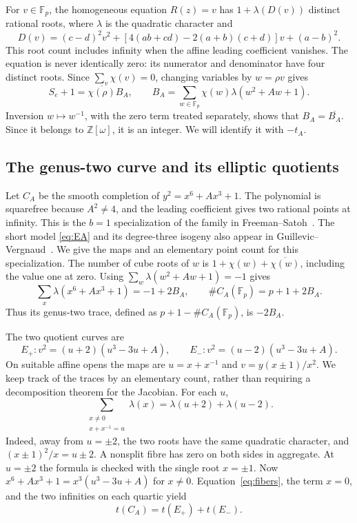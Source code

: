 \documentclass[11pt]{article}
\theoremstyle{definition}\newtheorem{definition}[theorem]{Definition}
\newcommand{\Fp}{\mathbb F_p}
\newcommand{\Z}{\mathbb Z}
\begin{document}
For $v\in\Fp$, the homogeneous equation $R(z)=v$ has
$1+\lambda(D(v))$ distinct rational roots, where $\lambda$ is
the quadratic character and
\[
 D(v)=(c-d)^2v^2+
 [4(ab+cd)-2(a+b)(c+d)]v+(a-b)^2.
\]
This root count includes infinity when the affine leading
coefficient vanishes. The equation is never identically zero:
its numerator and denominator have four distinct roots.
Since $\sum_v\chi(v)=0$, changing variables by $w=\rho v$ gives
\begin{equation}\label{eq:mixed}
 S_e+1=\overline{\chi(\rho)}B_A,\qquad
 B_A=\sum_{w\in\Fp}\chi(w)\lambda(w^2+Aw+1).
\end{equation}
Inversion $w\mapsto w^{-1}$, with the zero term treated separately,
shows that $B_A=\overline{B_A}$. Since it belongs to $\Z[\omega]$,
it is an integer. We will identify it with $-t_A$.

\subsection{The genus-two curve and its elliptic quotients}
Let $C_A$ be the smooth completion of
$y^2=x^6+Ax^3+1$. The polynomial is squarefree because $A^2\ne4$,
and the leading coefficient gives two rational points at infinity.
This is the $b=1$ specialization of the family in
Freeman--Satoh~\cite[Proposition 4.2]{freemansatoh}.
The short model \eqref{eq:EA} and its degree-three isogeny also
appear in Guillevic--Vergnaud~\cite[Section 3.1, p.~241]{guillevicvergnaud}.
We give the maps and an elementary point count for this specialization.
The number of cube roots of $w$ is
$1+\chi(w)+\overline{\chi(w)}$, including the value one at zero.
Using $\sum_w\lambda(w^2+Aw+1)=-1$ gives
\[
 \sum_x\lambda(x^6+Ax^3+1)=-1+2B_A,\qquad
 \#C_A(\Fp)=p+1+2B_A.
\]
Thus its genus-two trace, defined as $p+1-\#C_A(\Fp)$,
is $-2B_A$.

The two quotient curves are
\[
 E_+:v^2=(u+2)(u^3-3u+A),\qquad
 E_-:v^2=(u-2)(u^3-3u+A).
\]
On suitable affine opens the maps are
$u=x+x^{-1}$ and $v=y(x\pm1)/x^2$.
We keep track of the traces by an elementary count, rather than
requiring a decomposition theorem for the Jacobian.
For each $u$,
\begin{equation}\label{eq:fibers}
 \sum_{\substack{x\ne0\\x+x^{-1}=u}}\lambda(x)
 =\lambda(u+2)+\lambda(u-2).
\end{equation}
Indeed, away from $u=\pm2$, the two roots have the same
quadratic character, and $(x\pm1)^2/x=u\pm2$. A nonsplit fibre
has zero on both sides in aggregate. At $u=\pm2$ the formula
is checked with the single root $x=\pm1$.
Now
$x^6+Ax^3+1=x^3(u^3-3u+A)$ for $x\ne0$.
Equation~\eqref{eq:fibers}, the term $x=0$, and the two
infinities on each quartic yield
\begin{equation}\label{eq:trace-split}
 t(C_A)=t(E_+)+t(E_-).
\end{equation}
\end{document}
